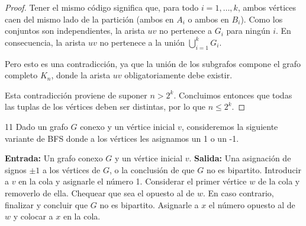 \begin{proof}
    Tener el mismo código significa que, para todo \(i = 1, \ldots, k\), ambos vértices caen del mismo lado de la partición (ambos en \(A_i\) o ambos en \(B_i\)). Como los conjuntos son independientes, la arista \(uv\) no pertenece a \(G_i\) para ningún \(i\). En consecuencia, la arista \(uv\) no pertenece a la unión \(\bigcup_{i=1}^k G_i\).

    Pero esto es una contradicción, ya que la unión de los subgrafos compone el grafo completo \(K_n\), donde la arista \(uv\) obligatoriamente debe existir.

    Esta contradicción proviene de suponer \(n > 2^k\). Concluimos entonces que todas las tuplas de los vértices deben ser distintas, por lo que \(n \leq 2^k\).
\end{proof}

\vspace{0.5cm}

\begin{ejercicio}{11}
    Dado un grafo \( G \) conexo y un vértice inicial \( v \), consideremos la siguiente variante de BFS donde a los vértices les asignamos un 1 o un -1.
\end{ejercicio}

\begin{algorithm}[h]
    \caption{BFS con signos}
    \label{alg:bfs-bipartito}
    \begin{algorithmic}[1]
        \State \textbf{Entrada:} Un grafo conexo $G$ y un vértice inicial $v$.
        \State \textbf{Salida:} Una asignación de signos $\pm 1$ a los vértices de $G$, o la conclusión de que $G$ no es bipartito.
        \vspace{0.2cm}
        \State Introducir a $v$ en la cola y asignarle el número 1.
        \State Considerar el primer vértice $w$ de la cola y removerlo de ella.
        \State Chequear que sea el opuesto al de $w$. En caso contrario, finalizar y concluir que $G$ no es bipartito.
        \Else
        \State Asignarle a $x$ el número opuesto al de $w$ y colocar a $x$ en la cola.
        \EndIf
        \EndFor
        \EndWhile
        \EndProcedure
    \end{algorithmic}
\end{algorithm}

